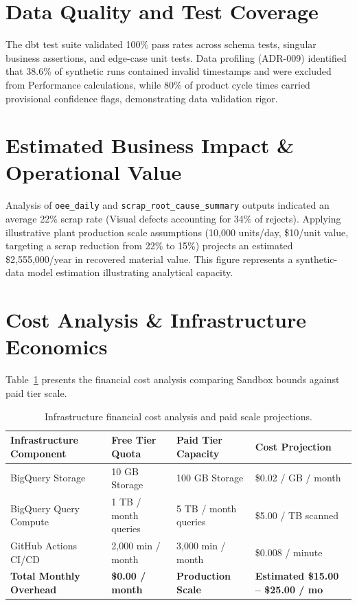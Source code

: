 \documentclass[12pt, a4paper]{report}
\begin{document}
\section{Data Quality and Test Coverage}
The dbt test suite validated 100\% pass rates across schema tests, singular business assertions, and edge-case unit tests. Data profiling (ADR-009) identified that 38.6\% of synthetic runs contained invalid timestamps and were excluded from Performance calculations, while 80\% of product cycle times carried provisional confidence flags, demonstrating data validation rigor.

\section{Estimated Business Impact \& Operational Value}
Analysis of \texttt{oee\_daily} and \texttt{scrap\_root\_cause\_summary} outputs indicated an average 22\% scrap rate (Visual defects accounting for 34\% of rejects). Applying illustrative plant production scale assumptions (10,000 units/day, \$10/unit value, targeting a scrap reduction from 22\% to 15\%) projects an estimated \$2,555,000/year in recovered material value. This figure represents a synthetic-data model estimation illustrating analytical capacity.

\section{Cost Analysis \& Infrastructure Economics}
Table~\ref{tab:cost-analysis} presents the financial cost analysis comparing Sandbox bounds against paid tier scale.

\begin{table}[h]
\centering
\begin{tabularx}{\textwidth}{l p{3.5cm} p{3.5cm} X}
\toprule
\textbf{\color{primary}Infrastructure Component} & \textbf{\color{primary}Free Tier Quota} & \textbf{\color{primary}Paid Tier Capacity} & \textbf{\color{primary}Cost Projection} \\
\midrule
BigQuery Storage & 10 GB Storage & 100 GB Storage & \$0.02 / GB / month \\
BigQuery Query Compute & 1 TB / month queries & 5 TB / month queries & \$5.00 / TB scanned \\
GitHub Actions CI/CD & 2,000 min / month & 3,000 min / month & \$0.008 / minute \\
\textbf{Total Monthly Overhead} & \textbf{\$0.00 / month} & \textbf{Production Scale} & \textbf{Estimated \$15.00 -- \$25.00 / mo} \\
\bottomrule
\end{tabularx}
\caption{Infrastructure financial cost analysis and paid scale projections.}
\label{tab:cost-analysis}
\end{table}
\end{document}
